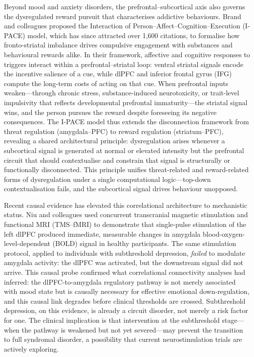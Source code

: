 Beyond mood and anxiety disorders, the prefrontal--subcortical axis also
governs the dysregulated reward pursuit that characterises addictive
behaviours.  Brand and colleagues proposed the Interaction of
Person--Affect--Cognition--Execution (I-PACE) model, which has since
attracted over 1,600 citations, to formalise how fronto-striatal imbalance
drives compulsive engagement with substances and behavioural rewards
alike.  In their framework, affective and cognitive responses to
triggers interact within a prefrontal--striatal loop: ventral striatal
signals encode the incentive salience of a cue, while dlPFC and inferior
frontal gyrus (IFG) compute the long-term costs of acting on that cue.
When prefrontal inputs weaken---through chronic stress, substance-induced
neurotoxicity, or trait-level impulsivity that reflects developmental
prefrontal immaturity---the striatal signal wins, and the person pursues
the reward despite foreseeing its negative consequences.  The I-PACE model
thus extends the disconnection framework from threat regulation
(amygdala--PFC) to reward regulation (striatum--PFC), revealing a shared
architectural principle: dysregulation arises whenever a subcortical signal
is generated at normal or elevated intensity but the prefrontal circuit
that should contextualise and constrain that signal is structurally or
functionally disconnected.  This principle unifies threat-related and
reward-related forms of dysregulation under a single computational
logic---top-down contextualisation fails, and the subcortical signal drives
behaviour unopposed.

Recent causal evidence has elevated this correlational architecture to
mechanistic status.  Niu and colleagues used concurrent transcranial
magnetic stimulation and functional MRI (TMS--fMRI) to demonstrate that
single-pulse stimulation of the left dlPFC produced immediate, measurable
changes in amygdala blood-oxygen-level-dependent (BOLD) signal in healthy
participants.  The same stimulation protocol, applied to
individuals with subthreshold depression, \emph{failed} to modulate
amygdala activity: the dlPFC was activated, but the downstream signal did
not arrive.  This causal probe confirmed what correlational connectivity
analyses had inferred: the dlPFC-to-amygdala regulatory pathway is not
merely associated with mood state but is causally necessary for effective
emotional down-regulation, and this causal link degrades before clinical
thresholds are crossed.  Subthreshold depression, on this evidence, is
already a circuit disorder, not merely a risk factor for one.  The clinical
implication is that intervention at the subthreshold stage---when the
pathway is weakened but not yet severed---may prevent the transition to
full syndromal disorder, a possibility that current neurostimulation trials
are actively exploring.

